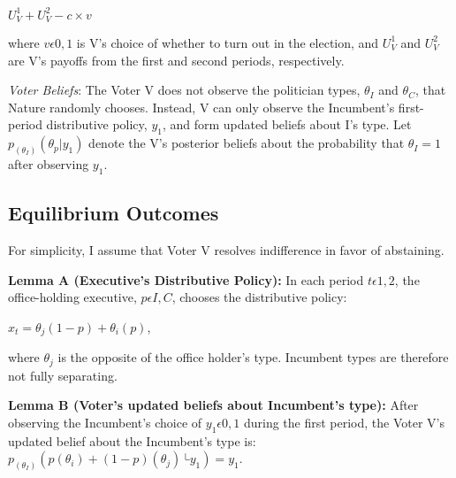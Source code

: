 \documentclass[12pt]{paper}
\begin{document}
$U_{V}^1 + U_{V}^2 - c \times v$

where $v\epsilon{0,1}$ is V’s choice of whether to turn out in the election, and $U_{V}^1$ and $U_{V}^2$ are V’s payoffs from the first and second periods, respectively.

\emph{Voter Beliefs}: The Voter V does not observe the politician types, $\theta_I$ and $\theta_C$, that Nature randomly chooses. Instead, V can only observe the Incumbent's first-period distributive policy,  $y_1$, and form updated beliefs about I’s type. Let $p_(\theta_I ) (\theta_p | y_1 )$ denote the V’s posterior beliefs about the probability that $\theta_I=1$ after observing $y_1$.

\subsection{Equilibrium Outcomes}
	For simplicity, I assume that Voter V resolves indifference in favor of abstaining.
	
\textbf{Lemma A (Executive’s Distributive Policy):} In each period $t\epsilon{1,2}$, the office-holding executive, $p\epsilon{I,C}$, chooses the distributive policy: 

$x_t=θ_j (1-p)+ θ_i (p)$, 

where $θ_j$ is the opposite of the office holder’s type. Incumbent types are therefore not fully separating. 


\textbf{Lemma B (Voter’s updated beliefs about Incumbent’s type):} After observing the Incumbent’s choice of $y_1\epsilon{0,1}$ during the first period, the Voter V’s updated belief about the Incumbent’s type is: $p_(θ_I ) (p(θ_i ) + (1-p)(θ_j ) ├ y_1 )=y_1$.
\end{document}
